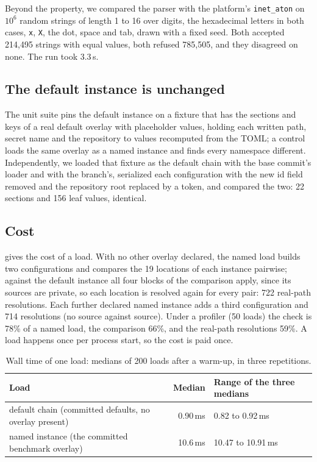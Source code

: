 \documentclass[11pt]{article}
\theoremstyle{plain}
\theoremstyle{definition}
\theoremstyle{remark}
\begin{document}
Beyond the property, we compared the parser with the platform's \texttt{inet\_aton} on $10^6$
random strings of length 1 to 16 over digits, the hexadecimal letters in both cases, \texttt{x},
\texttt{X}, the dot, space and tab, drawn with a fixed seed. Both accepted 214{,}495 strings with
equal values, both refused 785{,}505, and they disagreed on none. The run took 3.3\,s.

\subsection{The default instance is unchanged}
The unit suite pins the default instance on a fixture that has the sections and keys of a real
default overlay with placeholder values, holding each written path, secret name and the repository
to values recomputed from the TOML; a control loads the same overlay as a named instance and finds
every namespace different. Independently, we loaded that fixture as the default chain with the base
commit's loader and with the branch's, serialized each configuration with the new id field removed
and the repository root replaced by a token, and compared the two: 22 sections and 156 leaf values,
identical.

\subsection{Cost}
 gives the cost of a load. With no other overlay declared, the named load builds two
configurations and compares the 19 locations of each instance pairwise; against the default
instance all four blocks of the comparison apply, since its sources are private, so each location
is resolved again for every pair: 722 real-path resolutions. Each further declared named instance
adds a third configuration and 714 resolutions (no source against source). Under a profiler (50
loads) the check is 78\% of a named load, the comparison 66\%, and the real-path resolutions 59\%.
A load happens once per process start, so the cost is paid once.

\begin{table}[ht]
\centering\small
\caption{Wall time of one load: medians of 200 loads after a warm-up, in three
repetitions.}\label{tab:cost}
\begin{tabular}{@{}lrl@{}}
\toprule
Load & Median & Range of the three medians \\
\midrule
default chain (committed defaults, no overlay present) & 0.90\,ms & 0.82 to 0.92\,ms \\
named instance (the committed benchmark overlay) & 10.6\,ms & 10.47 to 10.91\,ms \\
\bottomrule
\end{tabular}
\end{table}
\end{document}
